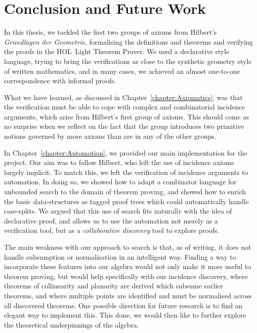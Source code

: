 \chapter{Conclusion and Future Work}\label{chapter:Conclusion}
In this thesis, we tackled the first two groups of axioms from Hilbert's \emph{Grundlagen der Geometrie}, formalising the definitions and theorems and verifying the proofs in the HOL~Light Theorem Prover. We used a declarative style language, trying to bring the verifications as close to the synthetic geometry style of written mathematics, and in many cases, we achieved an almost one-to-one correspondence with informal proofs.

What we have learned, as discussed in Chapter~\ref{chapter:Axiomatics}, was that the verification must be able to cope with complex and combinatorial incidence arguments, which arise from Hilbert's first group of axioms. This should come as no surprise when we reflect on the fact that the group introduces two primitive notions governed by more axioms than are in any of the other groups. 

In Chapter~\ref{chapter:Automation}, we provided our main implementation for the project. Our aim was to follow Hilbert, who left the use of incidence axioms largely implicit. To match this, we left the verification of incidence arguments to automation. In doing so, we showed how to adapt a combinator language for unbounded search to the domain of theorem proving, and showed how to enrich the basic data-structures as tagged proof trees which could automatically handle case-splits. We argued that this use of search fits naturally with the idea of declarative proof, and allows us to use the automation not merely as a verification tool, but as a \emph{collaborative discovery} tool to explore proofs.

The main weakness with our approach to search is that, as of writing, it does not handle subsumption or normalisation in an intelligent way. Finding a way to incorporate these features into our algebra would not only make it more useful to theorem proving, but would help specifically with our incidence discovery, where theorems of collinearity and planarity are derived which subsume earlier theorems, and where multiple points are identified and must be normalised across all discovered theorems. One possible direction for future research is to find an elegant way to implement this. This done, we would then like to further explore the theoretical underpinnings of the algebra.

